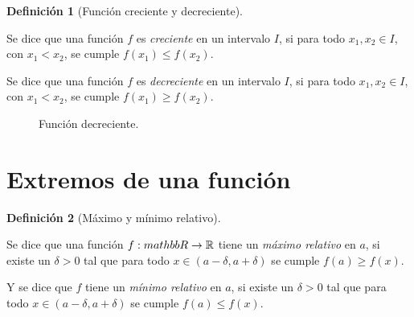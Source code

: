 \documentclass[
  a4paper,
]{scrreport}
\theoremstyle{plain}
\theoremstyle{plain}
\theoremstyle{definition}
\newtheorem{definition}{Definición}[chapter]
\theoremstyle{plain}
\theoremstyle{definition}
\theoremstyle{remark}
\begin{document}
\leavevmode{}%
\begin{definition}[Función creciente y
decreciente]\label{def-crecimiento-funcion}

Se dice que una función \(f\) es \emph{creciente} en un intervalo \(I\),
si para todo \(x_1,x_2\in I\), con \(x_1<x_2\), se cumple
\(f(x_1)\leq f(x_2)\).

Se dice que una función \(f\) es \emph{decreciente} en un intervalo
\(I\), si para todo \(x_1,x_2\in I\), con \(x_1<x_2\), se cumple
\(f(x_1)\geq f(x_2)\).

\end{definition}

\begin{figure}

\begin{minipage}[t]{0.50\linewidth}

{\centering 

\raisebox{-\height}{



}

\caption{Función creciente.}

}

\end{minipage}%
%
\begin{minipage}[t]{0.50\linewidth}

{\centering 

\raisebox{-\height}{



}

\caption{Función decreciente.}

}

\end{minipage}%

\end{figure}

\hypertarget{extremos-de-una-funciuxf3n}{%
\section{Extremos de una función}\label{extremos-de-una-funciuxf3n}}

\leavevmode{}%
\begin{definition}[Máximo y mínimo relativo]\label{def-extremos-funcion}

Se dice que una función \(f:\\mathbb{R}\rightarrow\mathbb{R}\) tiene un
\emph{máximo relativo} en \(a\), si existe un \(\delta>0\) tal que para
todo \(x\in (a-\delta,a+\delta)\) se cumple \(f(a)\geq f(x)\).

Y se dice que \(f\) tiene un \emph{mínimo relativo} en \(a\), si existe
un \(\delta>0\) tal que para todo \(x\in (a-\delta,a+\delta)\) se cumple
\(f(a)\leq f(x)\).

\end{definition}
\end{document}
